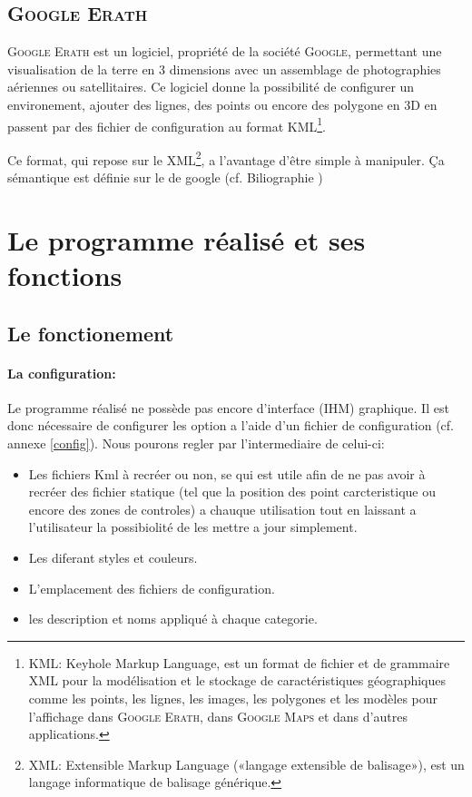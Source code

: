     \subsection{\textsc{Google Erath}}
\textsc{Google Erath} est un logiciel, propriété de la société \textsc{Google}, permettant une visualisation de la terre en 3 dimensions avec un assemblage de photographies aériennes ou satellitaires. Ce logiciel donne la possibilité de configurer un environement, ajouter des lignes, des points ou encore des polygone en 3D en passent par des fichier de configuration au format KML\footnote{\label{Kml}KML: Keyhole Markup Language, est un format de fichier et de grammaire XML pour la modélisation et le stockage de caractéristiques géographiques comme les points, les lignes, les images, les polygones et les modèles pour l'affichage dans \textsc{Google Erath}, dans \textsc{Google Maps} et dans d'autres applications.}.

Ce format, qui repose sur le XML\footnote{XML: Extensible Markup Language («langage extensible de balisage»), est un langage informatique de balisage générique.}, a l'avantage d’être simple à manipuler. Ça sémantique est définie sur le de google (cf. Biliographie \cite{gecode}) 



\section{Le programme réalisé et ses fonctions}
    \subsection{Le fonctionement}
            \paragraph{La configuration:}
Le programme réalisé ne possède pas encore d'interface (IHM) graphique. Il est donc nécessaire de configurer les option a l'aide d'un fichier de configuration (cf. annexe \vref{config}). Nous pourons regler par l'intermediaire de celui-ci:
\begin{itemize}
    \item Les fichiers Kml à recréer ou non, se qui est utile afin de ne pas avoir à recréer des fichier statique (tel que la position des point carcteristique ou encore des zones de controles) a chauque utilisation tout en laissant a l'utilisateur la possibiolité de les mettre a jour simplement.
    \item Les diferant styles et couleurs.
    \item L'emplacement des fichiers de configuration.
    \item les description et noms appliqué à chaque categorie.
\end{itemize}
